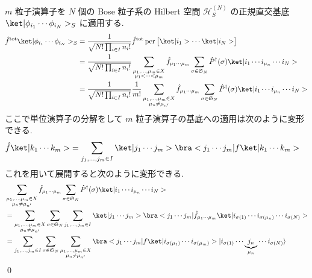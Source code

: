 \documentclass[uplatex,dvipdfmx,a4paper,11pt]{jlreq}
\makeatletter
\DeclareMathOperator{\per}{per}
\newcommand{\HH}{\mathcal{H}}
\renewcommand{\SS}{\mathfrak{S}}
\numberwithin{equation}{section}
\theoremstyle{definition}
\renewenvironment{proof}[1][\proofname]{\par
  \normalfont
  \topsep6\p@\@plus6\p@ \trivlist
  \item[\hskip\labelsep{\bfseries #1}\@addpunct{\bfseries}]\ignorespaces\quad\par
}{%
  \qed\endtrivlist\@endpefalse
}
\renewcommand\proofname{証明}
\makeatother
\begin{document}
\begin{proof}
  $m$ 粒子演算子を $N$ 個の Bose 粒子系の Hilbert 空間 $\HH_S^{(N)}$ の正規直交基底 $\ket|\phi_{i_1}\cdots\phi_{i_N}>_S$ に適用する.
  \begin{align}
    \hat{f}^{\mathrm{tot}}\ket|\phi_{i_1}\cdots\phi_{i_N}>_S & = \frac{1}{\sqrt{N!\prod_{i\in I}n_i!}}\hat{f}^{\mathrm{tot}}\per\begin{bmatrix}\ket|i_1>\cdots\ket|i_N>\end{bmatrix} \\
                                                             & = \frac{1}{\sqrt{N!\prod_{i\in I}n_i!}}\sum_{\substack{\mu_1,\ldots,\mu_m\in X                                        \\ \mu_1 < \cdots < \mu_m}}\hat{f}_{\mu_1\cdots\mu_m}\sum_{\sigma\in\SS_N}\hat{P}^\dagger(\sigma)\ket|i_1\cdots i_{\mu_n}\cdots i_N> \\
                                                             & = \frac{1}{\sqrt{N!\prod_{i\in I}n_i!}}\frac{1}{m!}\sum_{\substack{\mu_1,\ldots,\mu_m\in X                            \\ \mu_n\neq\mu_{n'}}}\hat{f}_{\mu_1\cdots\mu_m}\sum_{\sigma\in\SS_N}\hat{P}^\dagger(\sigma)\ket|i_1\cdots i_{\mu_n}\cdots i_N>
  \end{align}
  ここで単位演算子の分解をして $m$ 粒子演算子の基底への適用は次のように変形できる.
  \begin{align}
    \hat{f}\ket|k_1\cdots k_m> & = \sum_{j_1,\ldots,j_m\in I}\ket|j_1\cdots j_m>\bra<j_1\cdots j_m|f\ket|k_1\cdots k_m>
  \end{align}
  これを用いて展開すると次のように変形できる.
  \begin{align}
     & \sum_{\substack{\mu_1,\ldots,\mu_m\in X                                                  \\ \mu_n\neq\mu_{n'}}}\hat{f}_{\mu_1\cdots\mu_m}\sum_{\sigma\in\SS_N}\hat{P}^\dagger(\sigma)\ket|i_1\cdots i_{\mu_n}\cdots i_N> \\
     & = \sum_{\substack{\mu_1,\ldots,\mu_m\in X                                                \\ \mu_n \neq \mu_{n'}}}\sum_{\sigma\in\SS_N}\sum_{j_1,\ldots,j_m\in I}\ket|j_1\cdots j_m>\bra<j_1\cdots j_m|\hat{f}_{\mu_1\cdots\mu_m}\ket|i_{\sigma(1)}\cdots i_{\sigma(\mu_n)}\cdots i_{\sigma(N)}> \\
     & = \sum_{j_1,\ldots,j_m\in I}\sum_{\sigma\in\SS_N}\sum_{\substack{\mu_1,\ldots,\mu_m\in X \\ \mu_n \neq \mu_{n'}}}\bra<j_1\cdots j_m|f\ket|i_{\sigma(\mu_1)}\cdots i_{\sigma(\mu_m)}>|i_{\sigma(1)}\cdots\underbrace{j_n}_{\mu_n}\cdots i_{\sigma(N)}\rangle \\

\end{align}
\end{proof}
\end{document}
